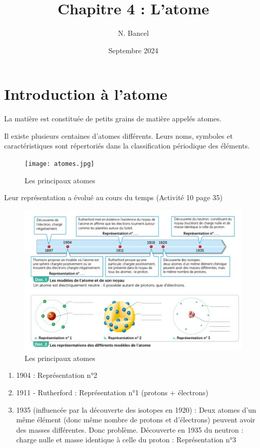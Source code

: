 \documentclass[a4paper,12pt]{article}
\begin{document}
\title{Chapitre 4 : L'atome}
\author{N. Bancel}
\date{Septembre 2024}
\maketitle

\section{Introduction à l'atome}

\begin{tcolorbox}[colback=green!10!white, colframe=green!75!black, title=Définition : L'atome]
  La matière est constituée de petits grains de matière appelés atomes.
\end{tcolorbox}

Il existe plusieurs centaines d'atomes différents. Leurs noms, symboles et caractéristiques sont répertoriés dans la classification périodique des éléments. \par


\begin{figure}[H]
  \centering
  \texttt{[image: atomes.jpg]}
  \caption{\label{} Les principaux atomes}
\end{figure}

Leur représentation a évolué au cours du temps (Activité 10 page 35)

\begin{figure}[H]
  \centering
  \includegraphics[width=\linewidth]{représentations_atomes.jpg}
  \caption{\label{} Les principaux atomes}
\end{figure}

\begin{enumerate}[noitemsep]
  \item 1904 : Représentation n°2
  \item 1911 - Rutherford : Représentation n°1 (protons + électrons)
  \item 1935 (influencée par la découverte des isotopes en 1920) : Deux atomes d'un même élément (donc même nombre de protons et d'électrons) peuvent avoir des masses différentes. Donc problème. Découverte en 1935 du neutron : charge nulle et masse identique à celle du proton : Représentation n°3
\end{enumerate}
\end{document}
